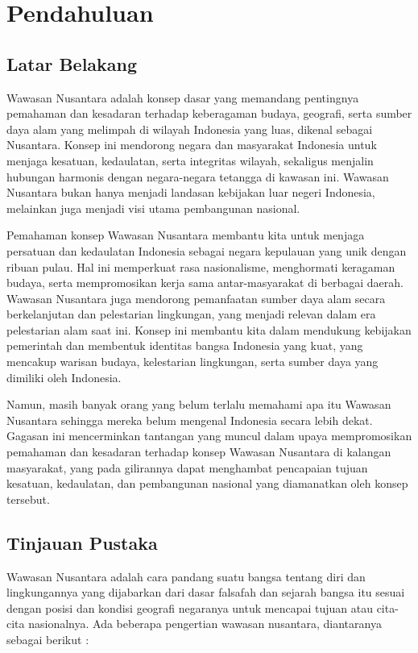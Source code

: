\chapter{Pendahuluan}

\section{Latar Belakang}
Wawasan Nusantara adalah konsep dasar yang memandang pentingnya pemahaman dan kesadaran terhadap keberagaman budaya, geografi, serta sumber daya alam yang melimpah di wilayah Indonesia yang luas, dikenal sebagai Nusantara. Konsep ini mendorong negara dan masyarakat Indonesia untuk menjaga kesatuan, kedaulatan, serta integritas wilayah, sekaligus menjalin hubungan harmonis dengan negara-negara tetangga di kawasan ini. Wawasan Nusantara bukan hanya menjadi landasan kebijakan luar negeri Indonesia, melainkan juga menjadi visi utama pembangunan nasional.

Pemahaman konsep Wawasan Nusantara membantu kita untuk menjaga persatuan dan kedaulatan Indonesia sebagai negara kepulauan yang unik dengan ribuan pulau. Hal ini memperkuat rasa nasionalisme, menghormati keragaman budaya, serta mempromosikan kerja sama antar-masyarakat di berbagai daerah. Wawasan Nusantara juga mendorong pemanfaatan sumber daya alam secara berkelanjutan dan pelestarian lingkungan, yang menjadi relevan dalam era pelestarian alam saat ini. Konsep ini membantu kita dalam mendukung kebijakan pemerintah dan membentuk identitas bangsa Indonesia yang kuat, yang mencakup warisan budaya, kelestarian lingkungan, serta sumber daya yang dimiliki oleh Indonesia.

Namun, masih banyak orang yang belum terlalu memahami apa itu Wawasan Nusantara sehingga mereka belum mengenal Indonesia secara lebih dekat. Gagasan ini mencerminkan tantangan yang muncul dalam upaya mempromosikan pemahaman dan kesadaran terhadap konsep Wawasan Nusantara di kalangan masyarakat, yang pada gilirannya dapat menghambat pencapaian tujuan kesatuan, kedaulatan, dan pembangunan nasional yang diamanatkan oleh konsep tersebut.

\section{Tinjauan Pustaka}
Wawasan Nusantara adalah cara pandang suatu bangsa tentang diri dan lingkungannya yang
dijabarkan dari dasar falsafah dan sejarah bangsa itu sesuai dengan posisi dan kondisi geografi
negaranya untuk mencapai tujuan atau cita-cita nasionalnya. Ada beberapa pengertian
wawasan nusantara, diantaranya sebagai berikut :

